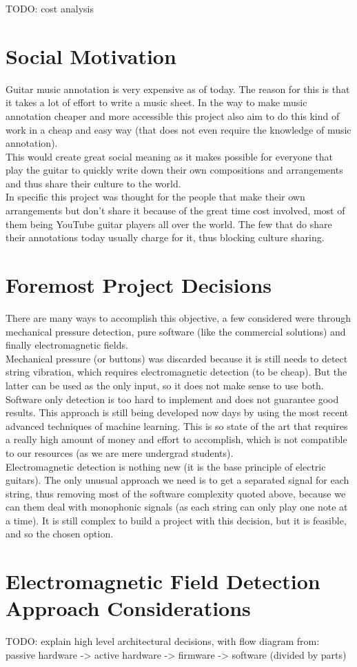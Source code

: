 TODO: cost analysis

\section{Social Motivation}
Guitar music annotation is very expensive as of today. The reason for this is that
it takes a lot of effort to write a music sheet. In the way to make music annotation
cheaper and more accessible this project also aim to do this kind of work in a cheap
and easy way (that does not even require the knowledge of music annotation). \\
This would create great social meaning as it makes possible for everyone that play
the guitar to quickly write down their own compositions and arrangements and thus
share their culture to the world. \\
In specific this project was thought for the people that make their own arrangements
but don't share it because of the great time cost involved, most of them being YouTube
guitar players all over the world. The few that do share their annotations today usually
charge for it, thus blocking culture sharing. \\

\section{Foremost Project Decisions}
There are many ways to accomplish this objective, a few considered were through
mechanical pressure detection, pure software (like the commercial solutions) and
finally electromagnetic fields. \\
Mechanical pressure (or buttons) was discarded because it is still needs to detect
string vibration, which requires electromagnetic detection (to be cheap). But the latter can
be used as the only input, so it does not make sense to use both. \\
Software only detection is too hard to implement and does not guarantee good results.
This approach is still being developed now days by using the most recent advanced
techniques of machine learning. This is so state of the art that requires a really high
amount of money and effort to accomplish, which is not compatible to our resources
(as we are mere undergrad students). \\
Electromagnetic detection is nothing new (it is the base principle of electric guitars).
The only unusual approach we need is to get a separated signal for each string, thus
removing most of the software complexity quoted above, because we can them deal
with monophonic signals (as each string can only play one note at a time). It is
still complex to build a project with this decision, but it is feasible, and so
the chosen option.

\section{Electromagnetic Field Detection Approach Considerations}
TODO: explain high level architectural decisions, with flow diagram from: \\
passive hardware  -> active hardware -> firmware -> software (divided by parts)